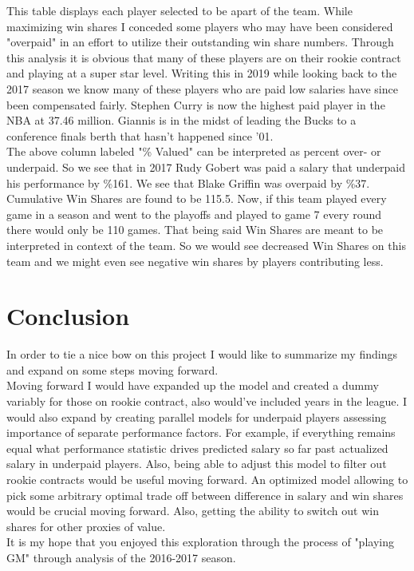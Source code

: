 \documentclass[12pt,english]{article}
\begin{document}
\newpage
\doublespacing
This table displays each player selected to be apart of the team. While maximizing win shares I conceded some players who may have been considered "overpaid" in an effort to utilize their outstanding win share numbers. Through this analysis it is obvious that many of these players are on their rookie contract and playing at a super star level. Writing this in 2019 while looking back to the 2017 season we know many of these players who are paid low salaries have since been compensated fairly. Stephen Curry is now the highest paid player in the NBA at 37.46 million. Giannis is in the midst of leading the Bucks to a conference finals berth that hasn't happened since '01. \\
\indent The above column labeled "\% Valued" can be interpreted as percent over- or underpaid. So we see that in 2017 Rudy Gobert was paid a salary that underpaid his performance by \%161. We see that Blake Griffin was overpaid by \%37. Cumulative Win Shares are found to be 115.5. Now, if this team played every game in a season and went to the playoffs and played to game 7 every round there would only be 110 games. That being said Win Shares are meant to be interpreted in context of the team. So we would see decreased Win Shares on this team and we might even see negative win shares by players contributing less. 
\newpage

\section{Conclusion}\label{sec:conclusion}
In order to tie a nice bow on this project I would like to summarize my findings and expand on some steps moving forward.\\
\indent Moving forward I would have expanded up the model and created a dummy variably for those on rookie contract, also would've included years in the league. I would also expand by creating parallel models for underpaid players assessing importance of separate performance factors. For example, if everything remains equal what performance statistic drives predicted salary so far past actualized salary in underpaid players. Also, being able to adjust this model to filter out rookie contracts would be useful moving forward. An optimized model allowing to pick some arbitrary optimal trade off between difference in salary and win shares would be crucial moving forward. Also, getting the ability to switch out win shares for other proxies of value.\\
It is my hope that you enjoyed this exploration through the process of "playing GM" through analysis of the 2016-2017 season. 
\end{document}
